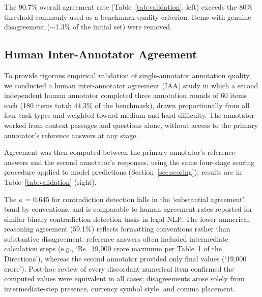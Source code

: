 The 90.7\% overall agreement rate (Table~\ref{tab:validation}, left) exceeds the 80\% threshold commonly used as a benchmark quality criterion. Items with genuine disagreement ($\sim$1.3\% of the initial set) were removed.

\subsection{Human Inter-Annotator Agreement}
\label{sec:iaa}

To provide rigorous empirical validation of single-annotator annotation quality, we conducted a human inter-annotator agreement (IAA) study in which a second independent human annotator completed three annotation rounds of 60 items each (180 items total; 44.3\% of the benchmark), drawn proportionally from all four task types and weighted toward medium and hard difficulty. The annotator worked from context passages and questions alone, without access to the primary annotator's reference answers at any stage.

Agreement was then computed between the primary annotator's reference answers and the second annotator's responses, using the same four-stage scoring procedure applied to model predictions (Section~\ref{sec:scoring}); results are in Table~\ref{tab:validation} (right).

The $\kappa$ = 0.645 for contradiction detection falls in the `substantial agreement' band by \citet{landiskoch1977} conventions, and is comparable to human agreement rates reported for similar binary contradiction detection tasks in legal NLP. The lower numerical reasoning agreement (59.1\%) reflects formatting conventions rather than substantive disagreement: reference answers often included intermediate calculation steps (e.g., `Rs.~19,000 crore maximum per Table~1 of the Directions'), whereas the second annotator provided only final values (`19,000 crore'). Post-hoc review of every discordant numerical item confirmed the computed values were equivalent in all cases; disagreements arose solely from intermediate-step presence, currency symbol style, and comma placement.

